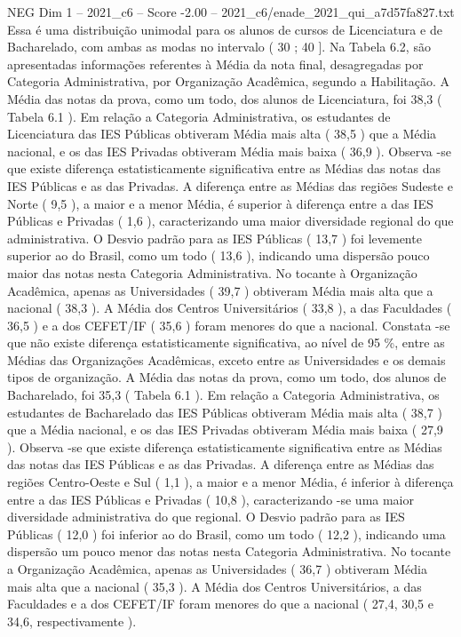\begin{textsample}{NEG Dim 1 – 2021\_c6 – Score -2.00 – 2021\_c6/enade\_2021\_qui\_a7d57fa827.txt}
Essa é uma distribuição unimodal para os alunos de cursos de Licenciatura e de Bacharelado, com ambas as modas no intervalo ( 30 ; 40 ].
Na Tabela 6.2, são apresentadas informações referentes à Média da nota final, desagregadas por Categoria Administrativa, por Organização Acadêmica, segundo a Habilitação.
A Média das notas da prova, como um todo, dos alunos de Licenciatura, foi 38,3 ( Tabela 6.1 ).
Em relação a Categoria Administrativa, os estudantes de Licenciatura das IES Públicas obtiveram Média mais alta ( 38,5 ) que a Média nacional, e os das IES Privadas obtiveram Média mais baixa ( 36,9 ).
Observa -se que existe diferença estatisticamente significativa entre as Médias das notas das IES Públicas e as das Privadas.
A diferença entre as Médias das regiões Sudeste e Norte ( 9,5 ), a maior e a menor Média, é superior à diferença entre a das IES Públicas e Privadas ( 1,6 ), caracterizando uma maior diversidade regional do que administrativa.
O Desvio padrão para as IES Públicas ( 13,7 ) foi levemente superior ao do Brasil, como um todo ( 13,6 ), indicando uma dispersão pouco maior das notas nesta Categoria Administrativa.
No tocante à Organização Acadêmica, apenas as Universidades ( 39,7 ) obtiveram Média mais alta que a nacional ( 38,3 ).
A Média dos Centros Universitários ( 33,8 ), a das Faculdades ( 36,5 ) e a dos CEFET/IF ( 35,6 ) foram menores do que a nacional.
Constata -se que não existe diferença estatisticamente significativa, ao nível de 95 \%, entre as Médias das Organizações Acadêmicas, exceto entre as Universidades e os demais tipos de organização.
A Média das notas da prova, como um todo, dos alunos de Bacharelado, foi 35,3 ( Tabela 6.1 ).
Em relação a Categoria Administrativa, os estudantes de Bacharelado das IES Públicas obtiveram Média mais alta ( 38,7 ) que a Média nacional, e os das IES Privadas obtiveram Média mais baixa ( 27,9 ).
Observa -se que existe diferença estatisticamente significativa entre as Médias das notas das IES Públicas e as das Privadas.
A diferença entre as Médias das regiões Centro-Oeste e Sul ( 1,1 ), a maior e a menor Média, é inferior à diferença entre a das IES Públicas e Privadas ( 10,8 ), caracterizando -se uma maior diversidade administrativa do que regional.
O Desvio padrão para as IES Públicas ( 12,0 ) foi inferior ao do Brasil, como um todo ( 12,2 ), indicando uma dispersão um pouco menor das notas nesta Categoria Administrativa.
No tocante a Organização Acadêmica, apenas as Universidades ( 36,7 ) obtiveram Média mais alta que a nacional ( 35,3 ).
A Média dos Centros Universitários, a das Faculdades e a dos CEFET/IF foram menores do que a nacional ( 27,4, 30,5 e 34,6, respectivamente ).

\end{textsample}

